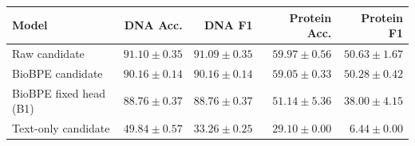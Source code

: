 \begin{tabular}{lrrrr}
\toprule
Model & DNA Acc. & DNA F1 & Protein Acc. & Protein F1 \\
\midrule
Raw candidate & $91.10 \pm 0.35$ & $91.09 \pm 0.35$ & $59.97 \pm 0.56$ & $50.63 \pm 1.67$ \\
BioBPE candidate & $90.16 \pm 0.14$ & $90.16 \pm 0.14$ & $59.05 \pm 0.33$ & $50.28 \pm 0.42$ \\
BioBPE fixed head (B1) & $88.76 \pm 0.37$ & $88.76 \pm 0.37$ & $51.14 \pm 5.36$ & $38.00 \pm 4.15$ \\
Text-only candidate & $49.84 \pm 0.57$ & $33.26 \pm 0.25$ & $29.10 \pm 0.00$ & $6.44 \pm 0.00$ \\
\bottomrule
\end{tabular}
